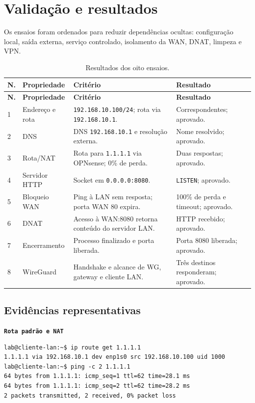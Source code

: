 \documentclass[12pt,a4paper]{article}
\newenvironment{terminalbox}[1][]{\par\medskip\noindent
 \textbf{\texttt{#1}}\par\nobreak}{\par\medskip}
\newcommand{\ip}[1]{\texttt{#1}}
\begin{document}
\section{Validação e resultados}
Os ensaios foram ordenados para reduzir dependências ocultas: configuração local,
saída externa, serviço controlado, isolamento da WAN, DNAT, limpeza e VPN.
\begin{longtable}{P{.6cm}P{3.1cm}P{5.1cm}P{4.5cm}}
\caption{Resultados dos oito ensaios.}\label{tab:resultados}\\\toprule
\textbf{N.}&\textbf{Propriedade}&\textbf{Critério}&\textbf{Resultado}\\\midrule\endfirsthead
\toprule\textbf{N.}&\textbf{Propriedade}&\textbf{Critério}&\textbf{Resultado}\\\midrule{}&Endereço e rota&\ip{192.168.10.100/24}; rota via \ip{192.168.10.1}.&Correspondentes; aprovado.\\
2&DNS&DNS \ip{192.168.10.1} e resolução externa.&Nome resolvido; aprovado.\\
3&Rota/NAT&Rota para \ip{1.1.1.1} via OPNsense; 0\% de perda.&Duas respostas; aprovado.\\
4&Servidor HTTP&Socket em \ip{0.0.0.0:8080}.&\texttt{LISTEN}; aprovado.\\
5&Bloqueio WAN&Ping à LAN sem resposta; porta WAN 80 expira.&100\% de perda e timeout; aprovado.\\
6&DNAT&Acesso à WAN:8080 retorna conteúdo do servidor LAN.&HTTP recebido; aprovado.\\
7&Encerramento&Processo finalizado e porta liberada.&Porta 8080 liberada; aprovado.\\
8&WireGuard&Handshake e alcance de WG, gateway e cliente LAN.&Três destinos responderam; aprovado.\\\bottomrule
\end{longtable}

\subsection{Evidências representativas}
\begin{terminalbox}[Rota padrão e NAT]
\begin{lstlisting}[style=terminal]
lab@cliente-lan:~$ ip route get 1.1.1.1
1.1.1.1 via 192.168.10.1 dev enp1s0 src 192.168.10.100 uid 1000
lab@cliente-lan:~$ ping -c 2 1.1.1.1
64 bytes from 1.1.1.1: icmp_seq=1 ttl=62 time=28.1 ms
64 bytes from 1.1.1.1: icmp_seq=2 ttl=62 time=28.2 ms
2 packets transmitted, 2 received, 0% packet loss
\end{lstlisting}\end{terminalbox}
\end{document}
